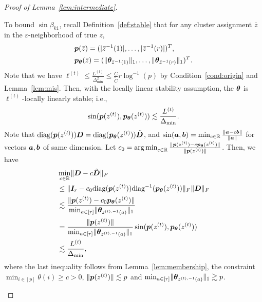 \documentclass[journal]{IEEEtran}
\theoremstyle{definition}
\theoremstyle{definition}
\begin{document}
\begin{proof}[Proof of Lemma~\ref{lem:intermediate}]
\begin{enumerate}[wide]
    To bound $\sin \beta_{k1}$, recall Definition~\ref{def:stable} that for any cluster assignment $\bar z$ in the $\varepsilon$-neighborhood of true $z$,
    \begin{align}
        &\bm{p}(\bar z)=(|\bar z^{-1}(1)|, \ldots,|\bar z^{-1}(r)|)^T,\quad\\
        &\bm{p}_{\boldsymbol{\theta}}(\bar z)=(\lVert\boldsymbol{\theta}_{\bar z^{-1}(1)}\rVert_1,\ldots,\lVert\boldsymbol{\theta}_{\bar z^{-1}(r)}\rVert_1)^T.
    \end{align}
    {Note that we have $\ell^{(t)} \leq \frac{L^{(t)}}{\Delta_{\min}^2} \leq \frac{\bar C}{\tilde C} r \log^{-1}(p) $ by Condition~\ref{cond:origin} and Lemma~\ref{lem:mis}. Then,  with the locally linear stability assumption, the $\boldsymbol{\theta}$ is $\ell^{(t)}$-locally linearly stable; i.e.,}
    \begin{equation}
         \sin (\bm{p}(z^{(t)}), \bm{p}_{\boldsymbol{\theta}}(z^{(t)})) \lesssim \frac{L^{(t)}}{\Delta_{\min}}. 
    \end{equation}
    Note that $\text{diag}(\bm{p}(z^{(t)})) \bm{D} = \text{diag}(\bm{p}_{\boldsymbol{\theta}}(z^{(t)})) \tilde {\bm{D}}$, and $\sin(\bm{a},\bm{b}) =\min_{c \in \mathbb{R}} \frac{ \lVert\bm{a} - c\bm{b}\rVert }{\lVert\bm{a}\rVert}$ for vectors $\bm{a},\bm{b}$ of same dimension. Let $c_0 = \operatorname*{arg\,min}_{c \in \mathbb{R}} \frac{\lVert\bm{p}(z^{(t)}) - c\bm{p}_{\boldsymbol{\theta}}(z^{(t)})\rVert}{\lVert\bm{p}(z^{(t)})\rVert}$. Then, we have
    \begin{align}
      &\min_{c \in \mathbb{R}} \lVert \bm{D} - c \tilde {\bm{D}}\rVert_F \\
      &\leq  \lVert \bm I_r - c_0 \text{diag}(\bm{p}(z^{(t)})) \text{diag}^{-1}(\bm{p}_{\boldsymbol{\theta}}(z^{(t)}))\rVert_F \lVert\bm{D}\rVert_F\\
      &\lesssim \frac{ \lVert \bm{p}(z^{(t)}) - c_0\bm{p}_{\boldsymbol{\theta}}(z^{(t)})\rVert }{\min_{a \in [r]} \lVert\boldsymbol{\theta}_{z^{(t),-1}(a)} \rVert_1  } \\
      & = \frac{\lVert \bm{p}(z^{(t)})\rVert }{\min_{a \in [r]} \lVert\boldsymbol{\theta}_{z^{(t),-1}(a)} \rVert_1 } \sin (\bm{p}(z^{(t)}), \bm{p}_{\boldsymbol{\theta}}(z^{(t)}))\\
      & \lesssim \frac{L^{(t)}}{\Delta_{\min}},
    \end{align}
    where the last inequality follows from Lemma~\ref{lem:membership}, the constraint $\min_{i \in [p]}\theta(i) \geq c>0$, $\lVert \bm{p}(z^{(t)})\rVert \lesssim p$ and $\min_{a \in [r]} \lVert\boldsymbol{\theta}_{z^{(t),-1}(a)} \rVert_1  \gtrsim p$. 
    

\end{enumerate}
\end{proof}
\end{document}
